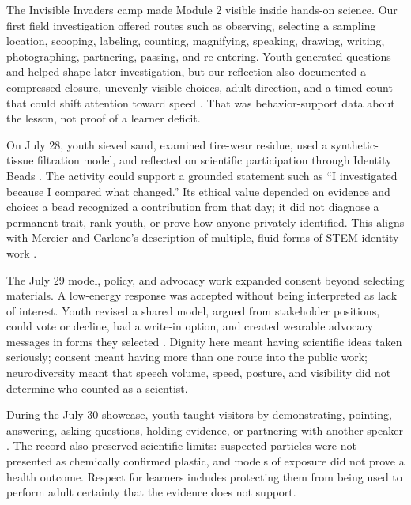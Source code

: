 
The Invisible Invaders camp made Module 2 visible inside hands-on science. Our first field investigation offered routes such as observing, selecting a sampling location, scooping, labeling, counting, magnifying, speaking, drawing, writing, photographing, partnering, passing, and re-entering. Youth generated questions and helped shape later investigation, but our reflection also documented a compressed closure, unevenly visible choices, adult direction, and a timed count that could shift attention toward speed \citep{campteam2026day1}. That was behavior-support data about the lesson, not proof of a learner deficit.

On July 28, youth sieved sand, examined tire-wear residue, used a synthetic-tissue filtration model, and reflected on scientific participation through Identity Beads \citep{campteam2026day3}. The activity could support a grounded statement such as ``I investigated because I compared what changed.'' Its ethical value depended on evidence and choice: a bead recognized a contribution from that day; it did not diagnose a permanent trait, rank youth, or prove how anyone privately identified. This aligns with Mercier and Carlone's description of multiple, fluid forms of STEM identity work \citep{mercier2021identibeads}.

The July 29 model, policy, and advocacy work expanded consent beyond selecting materials. A low-energy response was accepted without being interpreted as lack of interest. Youth revised a shared model, argued from stakeholder positions, could vote or decline, had a write-in option, and created wearable advocacy messages in forms they selected \citep{campteam2026day4}. Dignity here meant having scientific ideas taken seriously; consent meant having more than one route into the public work; neurodiversity meant that speech volume, speed, posture, and visibility did not determine who counted as a scientist.

During the July 30 showcase, youth taught visitors by demonstrating, pointing, answering, asking questions, holding evidence, or partnering with another speaker \citep{campteam2026day5}. The record also preserved scientific limits: suspected particles were not presented as chemically confirmed plastic, and models of exposure did not prove a health outcome. Respect for learners includes protecting them from being used to perform adult certainty that the evidence does not support.

